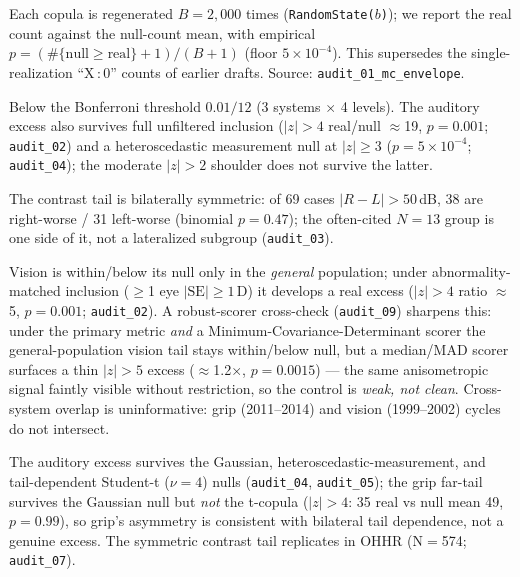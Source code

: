 \begin{table}[t]
\begin{threeparttable}
\begin{tablenotes}[flushleft]
\item[e] Each copula is regenerated $B{=}2{,}000$ times (\texttt{RandomState($b$)}); we report
the real count against the null-count mean, with empirical $p=(\#\{\text{null}\ge\text{real}\}{+}1)/(B{+}1)$
(floor $5{\times}10^{-4}$). This supersedes the single-realization ``X\,:\,0'' counts of
earlier drafts. Source: \texttt{audit\_01\_mc\_envelope}.
\item[f] Below the Bonferroni threshold $0.01/12$ (3 systems $\times$ 4 levels). The auditory
excess also survives full unfiltered inclusion ($|z|{>}4$ real/null $\approx$19, $p{=}0.001$;
\texttt{audit\_02}) and a heteroscedastic measurement null at $|z|{\ge}3$ ($p{=}5{\times}10^{-4}$;
\texttt{audit\_04}); the moderate $|z|{>}2$ shoulder does not survive the latter.
\item[g] The contrast tail is bilaterally symmetric: of 69 cases $|R{-}L|{>}50$\,dB, 38 are
right-worse / 31 left-worse (binomial $p{=}0.47$); the often-cited $N{=}13$ group is one
side of it, not a lateralized subgroup (\texttt{audit\_03}).
\item[h] Vision is within/below its null only in the \emph{general} population; under
abnormality-matched inclusion ($\ge$1 eye $|\mathrm{SE}|{\ge}1$\,D) it develops a real excess
($|z|{>}4$ ratio $\approx$5, $p{=}0.001$; \texttt{audit\_02}). A robust-scorer cross-check
(\texttt{audit\_09}) sharpens this: under the primary metric \emph{and} a Minimum-Covariance-Determinant
scorer the general-population vision tail stays within/below null, but a median/MAD scorer surfaces a
thin $|z|{>}5$ excess ($\approx$1.2$\times$, $p{=}0.0015$) --- the same anisometropic signal faintly
visible without restriction, so the control is \emph{weak, not clean}. Cross-system overlap is
uninformative: grip (2011--2014) and vision (1999--2002) cycles do not intersect.
\item[i] The auditory excess survives the Gaussian, heteroscedastic-measurement, and
tail-dependent Student-t ($\nu{=}4$) nulls (\texttt{audit\_04}, \texttt{audit\_05}); the
grip far-tail survives the Gaussian null but \emph{not} the t-copula ($|z|{>}4$: 35 real vs
null mean 49, $p{=}0.99$), so grip's asymmetry is consistent with bilateral tail dependence,
not a genuine excess. The symmetric contrast tail replicates in OHHR (N$=$574; \texttt{audit\_07}).
\end{tablenotes}
\end{threeparttable}
\end{table}
